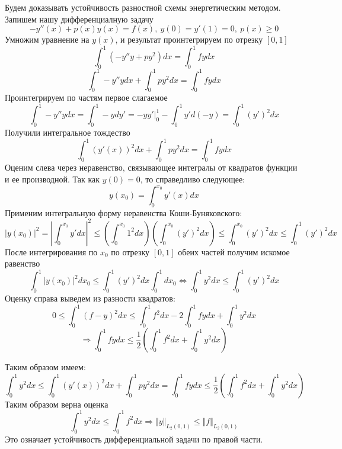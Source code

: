 \begin{task}
\begin{enumerate}[I.]
          Будем доказывать устойчивость разностной схемы энергетическим методом.
          Запишем нашу дифференциалную задачу
          \[-y''(x)+p(x)y(x)=f(x),\ y(0) = y'(1) = 0,\ p(x)\geq 0\]
          Умножим уравнение на $y(x)$, и результат проинтегрируем по отрезку $[0, 1]$
          \[\int_0^1 (-y''y+py^2)dx = \int_0^1fydx \]
          \[\int_0^1 -y''ydx+ \int_0^1py^2 dx = \int_0^1fydx \]
          Проинтегрируем по частям первое слагаемое
          \[\int_0^1 -y''ydx = \int_0^1-ydy' = -yy'\vert^1_0 - \int_0^1y'd(-y) = \int_0^1(y')^2dx\]
          Получили интегральное тождество
          \[\int_0^1 (y'(x))^2dx+ \int_0^1py^2 dx = \int_0^1fydx \]
          Оценим слева через неравенство, связывающее интегралы от квадратов
          функции и ее производной. Так как $y(0) = 0$, то справедливо следующее:
          \[y(x_0) = \int_0^{x_0}y'(x)dx\]
          Применим интегральную форму неравенства Коши-Буняковского:
          \[|y(x_0)|^2 = \left|\int_0^{x_0}y'dx\right|^2\leq\left(\int_0^{x_0}1^2dx\right)\left(\int_0^{x_0}(y')^2dx\right)\leq\int_0^{x_0}(y')^2dx\leq\int_0^{1}(y')^2dx\]
          После интегрирования по $x_0$ по отрезку $[0,1]$ обеих частей получим искомое равенство
          \[\int_0^1|y(x_0)|^2dx_0 \leq \int_0^{1}(y')^2dx\int_0^1dx_0 \Leftrightarrow \int_0^1y^2dx\leq\int_0^1(y')^2dx\]
          Оценку справа выведем из разности квадратов:
          \[0\leq\int_0^1(f - y)^2dx\leq\int_0^1f^2dx-2\int_0^1fydx+\int_0^1y^2dx\]
          \[\Rightarrow\int_0^1fydx\leq\frac{1}{2}\left(\int_0^1f^2dx + \int_0^1y^2dx\right)\]

          Таким образом имеем:
          \[\int_0^1y^2dx\leq\int_0^1 (y'(x))^2dx+ \int_0^1py^2 dx = \int_0^1fydx\leq\frac{1}{2}\left(\int_0^1f^2dx + \int_0^1y^2dx\right)\]
          Таким образом верна оценка
          \[\int_0^1y^2dx\leq\int_0^1f^2dx\Rightarrow\Vert y\Vert_{L_2(0,1)}\leq\Vert f\Vert_{L_2(0,1)}\]
          Это означает устойчивость дифференциальной задачи по правой части.


\end{enumerate}
\end{task}
